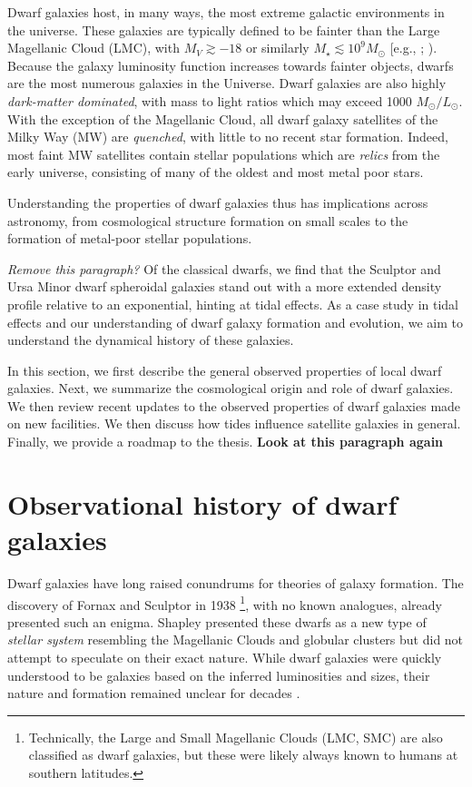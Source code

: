 Dwarf galaxies host, in many ways, the most extreme galactic
environments in the universe. These galaxies are typically defined to be
fainter than the Large Magellanic Cloud (LMC), with \(M_V \gtrsim -18\)
or similarly \(M_\star \lesssim 10^9 M_\odot\) {[}e.g.,
\citet{hodge1971}; \citet{mcconnachie2012}). Because the galaxy
luminosity function increases towards fainter objects, dwarfs are the
most numerous galaxies in the Universe. Dwarf galaxies are also highly
\emph{dark-matter dominated}, with mass to light ratios which may exceed
1000 \(M_\odot/ L_\odot\). With the exception of the Magellanic Cloud,
all dwarf galaxy satellites of the Milky Way (MW) are \emph{quenched},
with little to no recent star formation. Indeed, most faint MW
satellites contain stellar populations which are \emph{relics} from the
early universe, consisting of many of the oldest and most metal poor
stars.

Understanding the properties of dwarf galaxies thus has implications
across astronomy, from cosmological structure formation on small scales
to the formation of metal-poor stellar populations.

\emph{Remove this paragraph?} Of the classical dwarfs, we find that the
Sculptor and Ursa Minor dwarf spheroidal galaxies stand out with a more
extended density profile relative to an exponential, hinting at tidal
effects. As a case study in tidal effects and our understanding of dwarf
galaxy formation and evolution, we aim to understand the dynamical
history of these galaxies.

In this section, we first describe the general observed properties of
local dwarf galaxies. Next, we summarize the cosmological origin and
role of dwarf galaxies. We then review recent updates to the observed
properties of dwarf galaxies made on new facilities. We then discuss how
tides influence satellite galaxies in general. Finally, we provide a
roadmap to the thesis. \textbf{Look at this paragraph again}

\section{Observational history of dwarf
galaxies}\label{observational-history-of-dwarf-galaxies}

Dwarf galaxies have long raised conundrums for theories of galaxy
formation. The discovery of Fornax and Sculptor in 1938
\citep{shapley1938}\footnote{Technically, the Large and Small Magellanic
  Clouds (LMC, SMC) are also classified as dwarf galaxies, but these
  were likely always known to humans at southern latitudes.}, with no
known analogues, already presented such an enigma. Shapley presented
these dwarfs as a new type of \emph{stellar system} resembling the
Magellanic Clouds and globular clusters but did not attempt to speculate
on their exact nature. While dwarf galaxies were quickly understood to
be galaxies based on the inferred luminosities and sizes, their nature
and formation remained unclear for decades
\citep[e.g.,][]{hodge1971, gallagher+wyse1994}.

